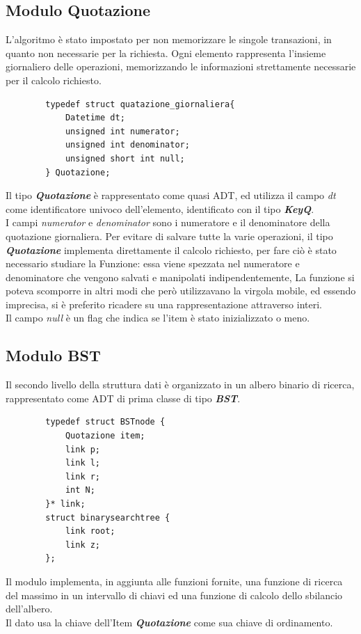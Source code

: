 \documentclass[11pt, a4paper, oneside, titlepage]{article}
\begin{document}
    \subsection{Modulo Quotazione}
    L'algoritmo è stato impostato per non memorizzare le singole transazioni, in quanto non necessarie per la richiesta. Ogni elemento rappresenta l'insieme giornaliero
    delle operazioni, memorizzando le informazioni strettamente necessarie per il calcolo richiesto.
    \begin{lstlisting}
        typedef struct quatazione_giornaliera{
            Datetime dt;
            unsigned int numerator;
            unsigned int denominator;
            unsigned short int null;
        } Quotazione;
    \end{lstlisting}
    Il tipo \textbf{\textit{Quotazione}} è rappresentato come quasi ADT, ed utilizza il campo \textit{dt} come identificatore univoco dell'elemento, 
    identificato con il tipo \textbf{\textit{KeyQ}}.\\
    I campi \textit{numerator} e \textit{denominator} sono i numeratore e il denominatore della quotazione giornaliera.
    Per evitare di salvare tutte la varie operazioni, il tipo \textbf{\textit{Quotazione}} implementa direttamente il calcolo richiesto, 
    per fare ciò è stato necessario studiare la Funzione: essa viene spezzata nel numeratore e denominatore che vengono salvati e manipolati indipendentemente,
    La funzione si poteva scomporre in altri modi che però utilizzavano la virgola mobile, ed essendo imprecisa, si è preferito ricadere su una rappresentazione attraverso interi.\\
    Il campo \textit{null} è un flag che indica se l'item è stato inizializzato o meno.
    
    \subsection{Modulo BST}
    Il secondo livello della struttura dati è organizzato in un albero binario di ricerca, rappresentato come ADT di prima classe di tipo \textbf{\textit{BST}}.
    \begin{lstlisting}
        typedef struct BSTnode {
            Quotazione item;
            link p;
            link l;
            link r;
            int N;
        }* link;
        struct binarysearchtree {
            link root;
            link z;
        };
    \end{lstlisting}
    Il modulo implementa, in aggiunta alle funzioni fornite, una funzione di ricerca del massimo in un intervallo di chiavi ed una funzione di calcolo dello sbilancio dell'albero.\\
    Il dato usa la chiave dell'Item \textbf{\textit{Quotazione}} come sua chiave di ordinamento.
\end{document}
